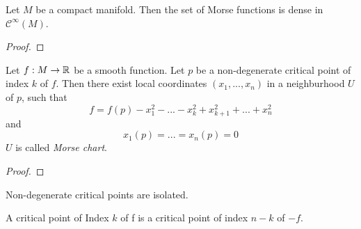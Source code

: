 \begin{theorem}
    Let $M$ be a compact manifold. Then the set of Morse functions is dense in 
    $\mathcal{C}^{\infty}(M)$.
\end{theorem}

\begin{proof}
\end{proof}

\begin{theorem}
    Let $f: M \to { \mathbb R }$ be a smooth function. Let $p$ be a non-degenerate critical point 
    of index $k$ of $f$. Then there exist local coordinates $(x_1, ..., x_n)$ in a 
    neighburhood $U$ of $p$, such that
    \[ f = f(p) - x_1^2 - ... - x_k^2 + x_{k + 1}^2 + ... + x_n^2 \]
    and
    \[ x_1(p) = ... = x_n(p) = 0 \]
    $U$ is called \textit{Morse chart}.
\end{theorem}

\begin{proof}
\end{proof}

\begin{corollary}
    Non-degenerate critical points are isolated.
\end{corollary}

\begin{remark}
    A critical point of Index $k$ of f is a critical point of index $n-k$ of $-f$.
\end{remark}
